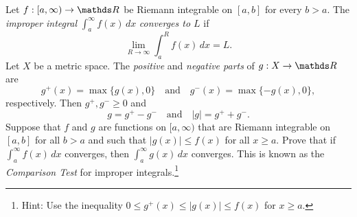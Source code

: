 \documentclass{../homework}
\begin{document}
\begin{Exercise}
	Let $f:[a,\infty) \to \R$ be Riemann integrable on $[a,b]$ for every
  $b > a$.  The \emph{improper integral} $\int_a^{\infty} f(x)\,dx$
  \emph{converges to $L$} if
	\begin{equation*}
		\lim_{R\to\infty} \int_a^R f(x)\,dx = L.
	\end{equation*}
  Let $X$ be a metric space.  The \emph{positive} and \emph{negative
    parts} of $g:X\to\R$ are
  \begin{equation*}
    g^+(x) = \max\{ g(x), 0\} \quad \text{and} \quad
    g^-(x) = \max\{ -g(x), 0\},
  \end{equation*}
  respectively.  Then $g^+, g^- \geq 0$ and
  \begin{equation*}
    g = g^+ - g^- \quad \text{and} \quad
    |g| = g^+ + g^-.
  \end{equation*}
	Suppose that $f$ and $g$ are functions on $[a,\infty)$ that are
  Riemann integrable on $[a,b]$ for all $b > a$ and such that
  $|g(x)| \leq f(x)$ for all $x \geq a$.  Prove that if
  $\int_a^{\infty} f(x)\,dx$ converges, then
  $\int_a^{\infty} g(x)\,dx$ converges.  This is known as the
  \emph{Comparison Test} for improper integrals.\footnote{Hint: Use
    the inequality $0 \leq g^+(x) \leq |g(x)| \leq f(x)$ for
    $x \geq a$.}

  \begin{solution}

  \end{solution}
\end{Exercise}
\end{document}
